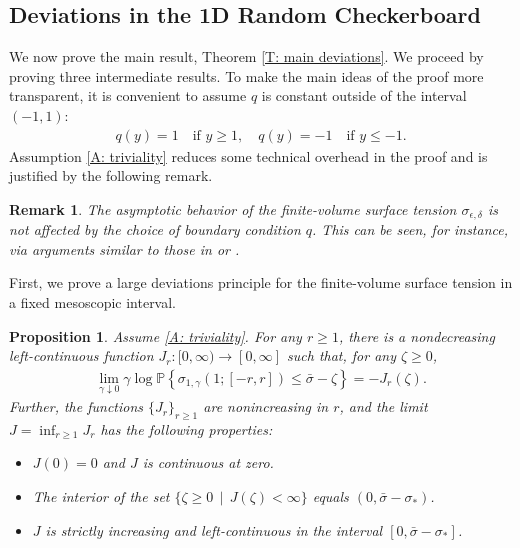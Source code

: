 \documentclass[12pt]{amsart}
\newtheorem{prop}{Proposition}
\newtheorem{remark}{Remark}
\begin{document}

\subsection{Deviations in the 1D Random Checkerboard} \label{S: overview large deviations} We now prove the main result, Theorem \ref{T: main deviations}.  We proceed by proving three intermediate results.
To make the main ideas of the proof more transparent, it is convenient to assume $q$ is constant outside of the interval $(-1,1)$:
	\begin{align} \label{A: triviality}
		q( y ) = 1 \quad \text{if} \, \, y \geq 1, \quad q(y) = -1 \quad \text{if} \, \, y \leq -1.
	\end{align}
Assumption \eqref{A: triviality} reduces some technical overhead in the proof and is justified by the following remark. 
		
		\begin{remark}\label{rmk: triviality} The asymptotic behavior of the finite-volume surface tension $\sigma_{\epsilon,\delta}$ is not affected by the choice of boundary condition $q$.  This can be seen, for instance, via arguments similar to those in \cite[Theorem 3.7]{ansini_braides_chiado-piat} or \cite[Proposition 10]{morfe}. 
		\end{remark}
        
First, we prove a large deviations principle for the finite-volume surface tension in a fixed mesoscopic interval.

	\begin{prop} \label{P: large deviations} Assume \eqref{A: triviality}.  For any $r \geq 1$, there is a nondecreasing left-continuous function $J_{r} : [0,\infty) \to [0,\infty]$ such that, for any $\zeta \geq 0$, 
		\begin{align}\label{eqn:ldp-principle-r}
				\lim_{ \gamma \downarrow 0 } \gamma \log \mathbb{P} \left\{ \sigma_{ 1, \gamma } ( 1 ; [-r,r] ) \leq \bar{\sigma} - \zeta \right\} = -J_{r}(\zeta).
		\end{align}
	Further, the functions $\{J_{r}\}_{r \geq 1}$ are nonincreasing in $r$, and the limit $J = \inf_{r \geq 1} J_{r}$ has the following properties:
		\begin{itemize}
			\item[(i)] $J(0) = 0$ and $J$ is continuous at zero.
			\item[(ii)] The interior of the set $\{ \zeta \geq 0 \, \mid \, J(\zeta) < \infty \}$ equals $(0,\bar{\sigma} - \sigma_{*})$.
			\item[(iii)] $J$ is strictly increasing and left-continuous in the interval $[0,\bar{\sigma} - \sigma_{*}]$. 		
		\end{itemize}  
	\end{prop}
\end{document}
